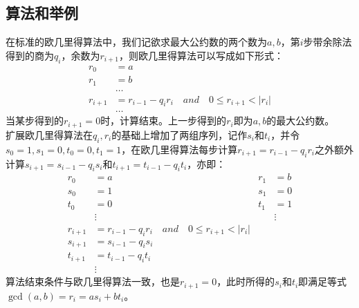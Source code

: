 \documentclass[UTF8]{ctexart}
\begin{document}
\subsection*{算法和举例}
在标准的欧几里得算法中，我们记欲求最大公约数的两个数为$a,b$，第$i$步带余除法得到的商为$q_i$，余数为$r_{i+1}$，则欧几里得算法可以写成如下形式：
\[
    \begin{aligned}
        r_0     & = a                                                       \\
        r_1     & = b                                                       \\
                & \ldots                                                    \\
        r_{i+1} & = r_{i-1} - q_ir_i \quad and \quad 0 \leq r_{i+1} < |r_i| \\
                & \ldots
    \end{aligned}
\]
当某步得到的$r_{i+1} = 0$时，计算结束。上一步得到的$r_i$即为$a,b$的最大公约数。\\
扩展欧几里得算法在$q_i,r_i$的基础上增加了两组序列，记作$s_i$和$t_i$，并令$s_0 = 1,s_1 = 0,t_0 = 0,t_1 = 1$，在欧几里得算法每步计算$r_{i+1} = r_{i-1} - q_i r_i$之外额外计算$s_{i+1} = s_{i-1} - q_is_i$和$t_{i+1} = t_{i-1} - q_it_i$，亦即：
\[
    \begin{aligned}
        r_0     & = a \qquad                                                & r_1 & = b    \\
        s_0     & = 1 \qquad                                                & s_1 & = 0    \\
        t_0     & = 0 \qquad                                                & t_1 & = 1    \\
                & \vdots \qquad                                             &     & \vdots \\
        r_{i+1} & = r_{i-1} - q_ir_i \quad and \quad 0 \leq r_{i+1} < |r_i|                \\
        s_{i+1} & = s_{i-1} - q_is_i                                                       \\
        t_{i+1} & = t_{i-1} - q_it_i                                                       \\
                & \vdots
    \end{aligned}
\]
算法结束条件与欧几里得算法一致，也是$r_{i+1} = 0$，此时所得的$s_i$和$t_i$即满足等式$\gcd(a,b) = r_i = as_i + bt_i$。
\end{document}
